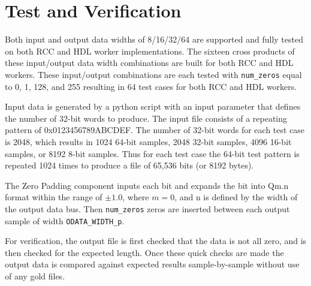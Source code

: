 \documentclass{article}
\begin{document}
\section*{Test and Verification}
\begin{flushleft}
	Both input and output data widths of 8/16/32/64 are supported and fully tested on both RCC and HDL worker implementations. The sixteen cross products of these input/output data width combinations are built for both RCC and HDL workers. These input/output combinations are each tested with \verb+num_zeros+ equal to 0, 1, 128, and 255 resulting in 64 test cases for both RCC and HDL workers.\medskip

	Input data is generated by a python script with an input parameter that defines the number of 32-bit words to produce. The input file consists of a repeating pattern of 0x0123456789ABCDEF. The number of 32-bit words for each test case is 2048, which results in 1024 64-bit samples, 2048 32-bit samples, 4096 16-bit samples, or 8192 8-bit samples. Thus for each test case the 64-bit test pattern is repeated 1024 times to produce a file of 65,536 bits (or 8192 bytes).\medskip

	The Zero Padding component inputs each bit and expands the bit into Qm.n format within the range of $\pm1.0$, where $m=0$, and n is defined by the width of the output data bus. Then \verb+num_zeros+ zeros are inserted between each output sample of width \verb+ODATA_WIDTH_p+.\medskip

	For verification, the output file is first checked that the data is not all zero, and is then checked for the expected length. Once these quick checks are made the output data is compared against expected results sample-by-sample without use of any gold files.
\end{flushleft}
\end{document}
